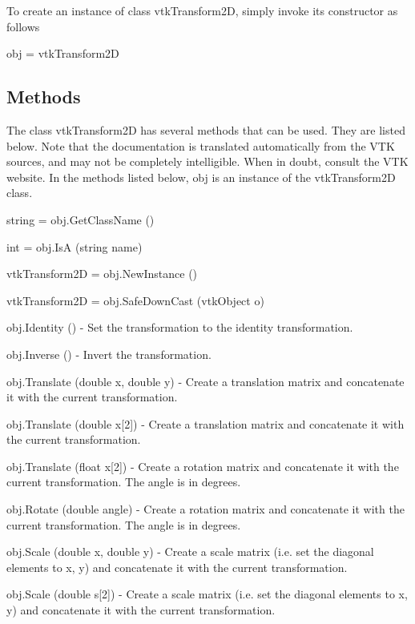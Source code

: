 To create an instance of class vtk\-Transform2\-D, simply invoke its constructor as follows \begin{DoxyVerb}  obj = vtkTransform2D
\end{DoxyVerb}
 \hypertarget{vtkwidgets_vtkxyplotwidget_Methods}{}\subsection{Methods}\label{vtkwidgets_vtkxyplotwidget_Methods}
The class vtk\-Transform2\-D has several methods that can be used. They are listed below. Note that the documentation is translated automatically from the V\-T\-K sources, and may not be completely intelligible. When in doubt, consult the V\-T\-K website. In the methods listed below, {\ttfamily obj} is an instance of the vtk\-Transform2\-D class. 
\begin{DoxyItemize}
\item {\ttfamily string = obj.\-Get\-Class\-Name ()}  
\item {\ttfamily int = obj.\-Is\-A (string name)}  
\item {\ttfamily vtk\-Transform2\-D = obj.\-New\-Instance ()}  
\item {\ttfamily vtk\-Transform2\-D = obj.\-Safe\-Down\-Cast (vtk\-Object o)}  
\item {\ttfamily obj.\-Identity ()} -\/ Set the transformation to the identity transformation.  
\item {\ttfamily obj.\-Inverse ()} -\/ Invert the transformation.  
\item {\ttfamily obj.\-Translate (double x, double y)} -\/ Create a translation matrix and concatenate it with the current transformation.  
\item {\ttfamily obj.\-Translate (double x\mbox{[}2\mbox{]})} -\/ Create a translation matrix and concatenate it with the current transformation.  
\item {\ttfamily obj.\-Translate (float x\mbox{[}2\mbox{]})} -\/ Create a rotation matrix and concatenate it with the current transformation. The angle is in degrees.  
\item {\ttfamily obj.\-Rotate (double angle)} -\/ Create a rotation matrix and concatenate it with the current transformation. The angle is in degrees.  
\item {\ttfamily obj.\-Scale (double x, double y)} -\/ Create a scale matrix (i.\-e. set the diagonal elements to x, y) and concatenate it with the current transformation.  
\item {\ttfamily obj.\-Scale (double s\mbox{[}2\mbox{]})} -\/ Create a scale matrix (i.\-e. set the diagonal elements to x, y) and concatenate it with the current transformation.  

\end{DoxyItemize}
